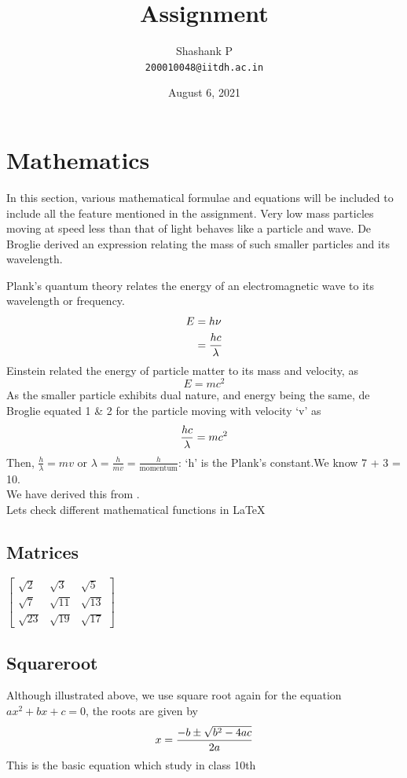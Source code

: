 \documentclass[10pt, a4paper]{article}
\begin{document}
	\title{Assignment}
	\author{Shashank P \\ \texttt{200010048@iitdh.ac.in}}
	\date{August 6, 2021}
	\maketitle
\newpage
\tableofcontents
\listoffigures
\listoftables
\newpage
\section{Mathematics}
In this section, various mathematical formulae and equations will be included
to include all the feature mentioned in the assignment. Very low mass particles
moving at speed less than that of light behaves like a particle and wave. De
Broglie derived an expression relating the mass of such smaller particles and its
wavelength. \par
Plank's quantum theory relates the energy of an electromagnetic wave to its
wavelength or frequency.
\begin{align} 
	E &=h\nu \notag\\ 
	&=\frac{hc}{\lambda}
\end{align}
Einstein related the energy of particle matter to its mass and velocity, as
\begin{equation} 
	E =mc^2
\end{equation}
As the smaller particle exhibits dual nature, and energy being the same, de
Broglie equated 1 \& 2 for the particle moving with velocity `v' as
\begin{equation} 
	\frac{hc}{\lambda} = mc^2 \notag
\end{equation}
Then, $\frac{h}{\lambda} = mv$ or $\lambda = \frac{h}{mv} = \frac{h}{\text{momentum}}$: `h' is the Plank's constant.We know 7 + 3 = 10.\\
We have derived this from \cite{verma2008concepts}. \\
Lets check different mathematical functions in \LaTeX			
	\subsection{Matrices}
    $\begin{bmatrix}
    	\sqrt2 & \sqrt3 & \sqrt5 \\
    	\sqrt7 & \sqrt{11} & \sqrt{13} \\
    	\sqrt{23} & \sqrt{19} & \sqrt{17}
    \end{bmatrix}$
	\subsection{Squareroot}
	Although illustrated above, we use square root again for the equation $ax^2+bx+c=0$, the roots are given by
	\begin{equation} 
		x = \frac{-b\pm\sqrt{b^2-4ac}}{2a} \notag
	\end{equation}
    This is the basic equation which study in class 10th \cite{education2016mathematics}
    \newpage
\end{document}
